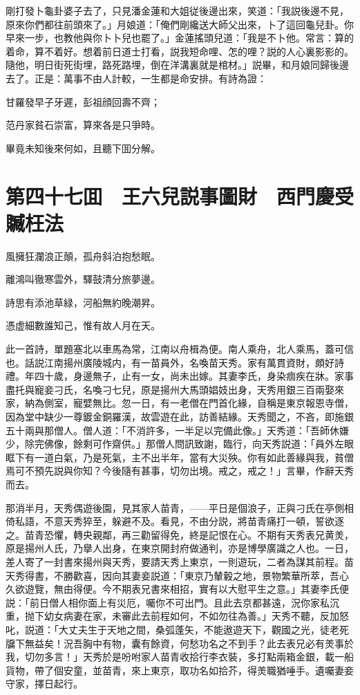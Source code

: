 剛打發卜龜卦婆子去了，只見潘金蓮和大姐従後邊出來，笑道：「我説後邊不見，原來你們都往前頭來了。」月娘道：「俺們剛纔送大師父出來，卜了這回龜兒卦。你早來一步，也教他與你卜卜兒也罷了。」金蓮搖頭兒道：「我是不卜他。常言：算的着命，算不着好。想着前日道士打看，説我短命哩、怎的哩？説的人心裏影影的。隨他，明日街死街埋，路死路埋，倒在洋溝裏就是棺材。」説畢，和月娘同歸後邊去了。正是：萬事不由人計較，一生都是命安排。有詩為證：

甘羅發早子牙遲，彭祖顔回壽不齊；

范丹家貧石崇富，算來各是只爭時。

畢竟未知後來何如，且聽下囬分解。

\chapter*{第四十七囬　王六兒説事圖財　西門慶受贓枉法}

風擁狂瀾浪正顛，孤舟斜泊抱愁眠。

離鴻叫徹寒雲外，驛鼓清分旅夢邊。

詩思有添池草緑，河船無約晚潮昇。

憑虚細數誰知己，惟有故人月在天。

此一首詩，單題塞北以車馬為常，江南以舟楫為便。南人乘舟，北人乘馬，蓋可信也。話説江南揚州廣陵城内，有一苗員外，名喚苗天秀。家有萬貫資財，頗好詩禮。年四十歲，身邊無子，止有一女，尚未出嫁。其妻李氏，身染痼疾在牀。家事盡托與寵妾刁氏，名喚刁七兒，原是揚州大馬頭娼妓出身，天秀用銀三百兩娶來家，納為側室，寵嬖無比。忽一日，有一老僧在門首化緣，自稱是東京報恩寺僧，因為堂中缺少一尊鍍金銅羅漢，故雲遊在此，訪善結緣。天秀聞之，不吝，即施銀五十兩與那僧人。僧人道：「不消許多，一半足以完備此像。」天秀道：「吾師休嫌少，除完佛像，餘剩可作齋供。」那僧人問訊致謝，臨行，向天秀説道：「員外左眼眶下有一道白氣，乃是死氣，主不出半年，當有大災殃。你有如此善緣與我，貧僧焉可不預先説與你知？今後隨有甚事，切勿出境。戒之，戒之！」言畢，作辭天秀而去。

那消半月，天秀偶遊後園，見其家人苗青，——平日是個浪子，正與刁氏在亭側相倚私語，不意天秀猝至，躲避不及。看見，不由分説，將苗青痛打一頓，誓欲逐之。苗青恐懼，轉央親鄰，再三勸留得免，終是記恨在心。不期有天秀表兄黄羙，原是揚州人氏，乃擧人出身，在東京開封府做通判，亦是博學廣識之人也。一日，差人寄了一封書來揚州與天秀，要請天秀上東京，一則遊玩，二者為謀其前程。苗天秀得書，不勝歡喜，因向其妻妾説道：「東京乃輦轂之地，景物繁華所萃，吾心久欲遊覽，無由得便。今不期表兄書來相招，實有以大慰平生之意。」其妻李氏便説：「前日僧人相你面上有災厄，囑你不可出門。且此去京都甚遠，況你家私沉重，抛下幼女病妻在家，未審此去前程如何，不如勿往為善。」天秀不聽，反加怒叱，説道：「大丈夫生于天地之間，桑弧蓬矢，不能遨遊天下，觀國之光，徒老死牖下無益矣！況吾胸中有物，囊有餘資，何愁功名之不到手？此去表兄必有羙事於我，切勿多言！」天秀於是吩咐家人苗青收拾行李衣裝，多打點兩箱金銀，載一船貨物，帶了個安童，並苗青，來上東京，取功名如拾芥，得羙職猶唾手。遺囑妻妾守家，擇日起行。

